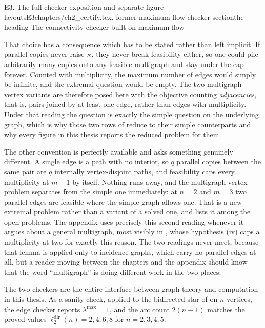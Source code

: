 \begin{offcut}{E3. The full checker exposition and separate figure layouts}{E3}{chapters/ch2\_certify.tex, former maximum-flow checker section}{the heading The connectivity checker built on maximum flow}
\begin{remark}
That choice has a consequence which has to be stated rather than left implicit. If parallel copies never raise $\kappa$, they never break feasibility either, so one could pile arbitrarily many copies onto any feasible multigraph and stay under the cap forever. Counted with multiplicity, the maximum number of edges would simply be infinite, and the extremal question would be empty. The two multigraph vertex variants are therefore posed here with the objective counting \emph{adjacencies}, that is, pairs joined by at least one edge, rather than edges with multiplicity. Under that reading the question is exactly the simple question on the underlying graph, which is why those two rows of  reduce to their simple counterparts and why every figure in this thesis reports the reduced problem for them.

The other convention is perfectly available and asks something genuinely different. A single edge is a path with no interior, so $q$ parallel copies between the same pair are $q$ internally vertex-disjoint paths, and feasibility caps every multiplicity at $m-1$ by itself. Nothing runs away, and the multigraph vertex problem separates from the simple one immediately: at $n = 2$ and $m = 3$ two parallel edges are feasible where the simple graph allows one. That is a new extremal problem rather than a variant of a solved one, and  lists it among the open problems. The appendix uses precisely this second reading whenever it argues about a general multigraph, most visibly in , whose hypothesis (iv) caps a multiplicity at two for exactly this reason. The two readings never meet, because that lemma is applied only to incidence graphs, which carry no parallel edges at all, but a reader moving between the chapters and the appendix should know that the word ``multigraph'' is doing different work in the two places.
\end{remark}

The two checkers are the entire interface between graph theory and computation in this thesis. As a sanity check, applied to the bidirected star of  on $n$ vertices, the edge checker reports $\lambda^{\max} = 1$, and the arc count $2(n-1)$ matches the proved values $\ell_2^{\mathrm{dir}}(n) = 2, 4, 6, 8$ for $n = 2, 3, 4, 5$.


\end{offcut}
